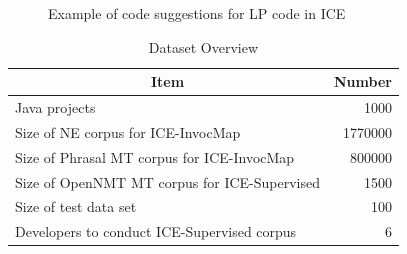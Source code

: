 \documentclass[sigconf,review]{acmart}
\begin{document}
\begin{figure}
        \caption{Example of code suggestions for LP code in ICE}
        \label{figExample1} 
\end{figure}

\begin{table}[]
\small
\caption{Dataset Overview}
\label{tblOverview}
\centering
\begin{tabular}{|l|r|}
\hline
\multicolumn{1}{|c|}{\textbf{Item}}                & \multicolumn{1}{c|}{\textbf{Number}} \\ \hline
Java projects                                      & 1000                                 \\ \hline
Size of NE corpus for ICE-InvocMap               & 1770000                              \\ \hline
Size of Phrasal MT corpus for ICE-InvocMap                 & 800000                                                               \\ \hline
Size of OpenNMT MT corpus for ICE-Supervised                 & 1500                                                               \\ \hline
Size of test data set & 100                                  \\ \hline
Developers to conduct ICE-Supervised corpus        & 6                                    \\ \hline

\end{tabular}
\end{table}
\end{document}
